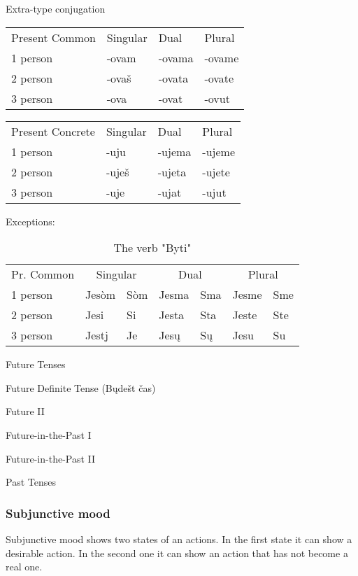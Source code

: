 Extra-type conjugation

\begin{table}[h]
	\begin{tabular}{llll}
		Present Common & Singular & Dual & Plural \\
		1 person & -ovam & -ovama & -ovame \\
		2 person & -ovaš & -ovata & -ovate \\
		3 person & -ova & -ovat & -ovut
	\end{tabular}
\end{table}


\begin{table}[h]
	\begin{tabular}{llll}
		Present Concrete & Singular & Dual & Plural \\
		1 person & -uju & -ujema & -ujeme \\
		2 person & -uješ & -ujeta & -ujete \\
		3 person & -uje & -ujat & -ujut
	\end{tabular}
\end{table}


Exceptions:

\begin{table}[h]
	\caption{The verb "Byti"}
	\begin{tabular}{lllllll}
		Pr. Common
			& \multicolumn{2}{c}{Singular}
			 & \multicolumn{2}{c}{Dual}
			 & \multicolumn{2}{c}{Plural} \\
		1 person & Jesòm & Sòm & Jesma & Sma & Jesme & Sme \\
		2 person & Jesi & Si & Jesta & Sta & Jeste & Ste \\
		3 person & Jestj & Je & Jesų & Sų & Jesu & Su
	\end{tabular}
\end{table}


Future Tenses

Future Definite Tense (Bųdešt čas)

Future II

Future-in-the-Past I

Future-in-the-Past II

Past Tenses

\subsubsection{Subjunctive mood}

Subjunctive mood shows two states of an actions. In the first state it can show a desirable action. In the second one it can show an action that has not become a real one. 

